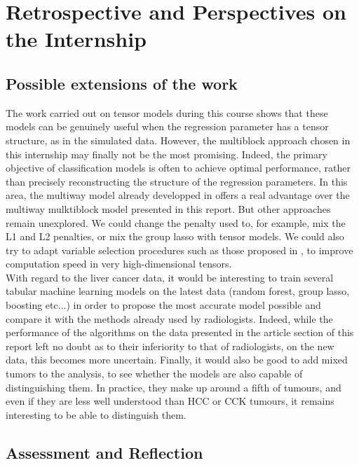 \documentclass[preprint,12pt]{elsarticle}
\begin{document}
\section{Retrospective and Perspectives on the Internship}

\subsection{Possible extensions of the work}

The work carried out on tensor models during this course shows that these models can be genuinely useful when the regression parameter has a tensor structure, as in the simulated data. However, the multiblock approach chosen in this internship may finally not be the most promising. Indeed, the primary objective of classification models is often to achieve optimal performance, rather than precisely reconstructing the structure of the regression parameters. In this area, the multiway model already developped in \cite{multi_rank_r} offers a real advantage over the multiway mulktiblock model presented in this report. But other approaches remain unexplored. We could change the penalty used to, for example, mix the L1 and L2 penalties, or mix the group lasso with tensor models. We could also try to adapt variable selection procedures such as those proposed in \cite{sis}, to improve computation speed in very high-dimensional tensors.\\
\indent With regard to the liver cancer data, it would be interesting to train several tabular machine learning models on the latest data (random forest, group lasso, boosting etc...) in order to propose the most accurate model possible and compare it with the methods already used by radiologists. Indeed, while the performance of the algorithms on the data presented in the article section of this report left no doubt as to their inferiority to that of radiologists, on the new data, this becomes more uncertain. Finally, it would also be good to add mixed tumors to the analysis, to see whether the models are also capable of distinguishing them. In practice, they make up around a fifth of tumours, and even if they are less well understood than HCC or CCK tumours, it remains interesting to be able to distinguish them.\\

\subsection{Assessment and Reflection}
\end{document}
